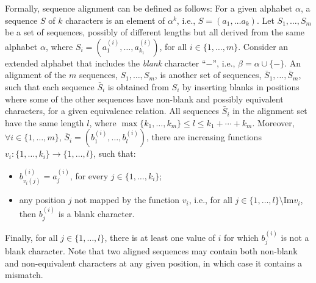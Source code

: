 Formally, sequence alignment can be defined as follows:
For a given alphabet $\alpha$, a sequence $S$ of $k$ characters is an element of
$\alpha^k$, i.e., $S = (a_1, \ldots a_k)$.
Let $S_1, \ldots, S_m$ be a set of sequences, possibly of different lengths but
all derived from the same alphabet $\alpha$, where
$S_i = (a_1^{(i)}, \ldots, a_{k_1}^{(i)})$, for all $i\in\{1,\ldots,m\}$.
Consider an extended alphabet that includes the \textit{blank} character ``$-$'',
i.e., $\beta = \alpha \cup \{-\}$.
An alignment of the $m$ sequences, $S_1, \ldots, S_m$, is another set of sequences,
$\bar{S}_1, \ldots, \bar{S}_m$, such that each sequence $\bar{S}_i$ is obtained
from $S_i$ by inserting blanks in positions where some of the other sequences
have non-blank and possibly equivalent characters, for a given equivalence relation.
All sequences $\bar{S}_i$ in the alignment set have the same length $l$, where
$\max\{k_1,\ldots,k_m\} \leq l \leq k_1 + \cdots + k_m$.
Moreover, $\forall i\in\{1,\ldots, m\}$, $\bar{S}_i = (b_1^{(i)},\ldots,b_l^{(i)})$,
there are increasing functions $v_i: \{1,\ldots,k_i\} \to \{1,\ldots,l\}$, such that:
\begin{itemize}[noitemsep,topsep=0pt]
\item $b_{v_i(j)}^{(i)} = a_j^{(i)}$, for every $j \in \{1,\ldots,k_i\}$;
\item any position $j$ not mapped by the function $v_i$, i.e.,
for all $j \in \{1,\ldots,l\}\setminus \textrm{Im} v_i$,
then $b_j^{(i)}$ is a blank character.
\end{itemize}
Finally, for all $j\in\{1,\ldots,l\}$, there is at least one value of $i$ for
which $b_j^{(i)}$ is not a blank character.
Note that two aligned sequences may contain both non-blank and non-equivalent characters at any given position, in which case it contains a
mismatch.



